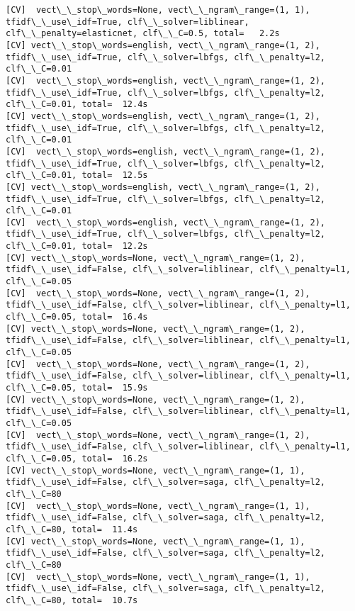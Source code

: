 \documentclass[11pt]{article}
\begin{document}
    \begin{Verbatim}[commandchars=\\\{\}]
[CV]  vect\_\_stop\_words=None, vect\_\_ngram\_range=(1, 1), tfidf\_\_use\_idf=True, clf\_\_solver=liblinear, clf\_\_penalty=elasticnet, clf\_\_C=0.5, total=   2.2s
[CV] vect\_\_stop\_words=english, vect\_\_ngram\_range=(1, 2), tfidf\_\_use\_idf=True, clf\_\_solver=lbfgs, clf\_\_penalty=l2, clf\_\_C=0.01 
[CV]  vect\_\_stop\_words=english, vect\_\_ngram\_range=(1, 2), tfidf\_\_use\_idf=True, clf\_\_solver=lbfgs, clf\_\_penalty=l2, clf\_\_C=0.01, total=  12.4s
[CV] vect\_\_stop\_words=english, vect\_\_ngram\_range=(1, 2), tfidf\_\_use\_idf=True, clf\_\_solver=lbfgs, clf\_\_penalty=l2, clf\_\_C=0.01 
[CV]  vect\_\_stop\_words=english, vect\_\_ngram\_range=(1, 2), tfidf\_\_use\_idf=True, clf\_\_solver=lbfgs, clf\_\_penalty=l2, clf\_\_C=0.01, total=  12.5s
[CV] vect\_\_stop\_words=english, vect\_\_ngram\_range=(1, 2), tfidf\_\_use\_idf=True, clf\_\_solver=lbfgs, clf\_\_penalty=l2, clf\_\_C=0.01 
[CV]  vect\_\_stop\_words=english, vect\_\_ngram\_range=(1, 2), tfidf\_\_use\_idf=True, clf\_\_solver=lbfgs, clf\_\_penalty=l2, clf\_\_C=0.01, total=  12.2s
[CV] vect\_\_stop\_words=None, vect\_\_ngram\_range=(1, 2), tfidf\_\_use\_idf=False, clf\_\_solver=liblinear, clf\_\_penalty=l1, clf\_\_C=0.05 
[CV]  vect\_\_stop\_words=None, vect\_\_ngram\_range=(1, 2), tfidf\_\_use\_idf=False, clf\_\_solver=liblinear, clf\_\_penalty=l1, clf\_\_C=0.05, total=  16.4s
[CV] vect\_\_stop\_words=None, vect\_\_ngram\_range=(1, 2), tfidf\_\_use\_idf=False, clf\_\_solver=liblinear, clf\_\_penalty=l1, clf\_\_C=0.05 
[CV]  vect\_\_stop\_words=None, vect\_\_ngram\_range=(1, 2), tfidf\_\_use\_idf=False, clf\_\_solver=liblinear, clf\_\_penalty=l1, clf\_\_C=0.05, total=  15.9s
[CV] vect\_\_stop\_words=None, vect\_\_ngram\_range=(1, 2), tfidf\_\_use\_idf=False, clf\_\_solver=liblinear, clf\_\_penalty=l1, clf\_\_C=0.05 
[CV]  vect\_\_stop\_words=None, vect\_\_ngram\_range=(1, 2), tfidf\_\_use\_idf=False, clf\_\_solver=liblinear, clf\_\_penalty=l1, clf\_\_C=0.05, total=  16.2s
[CV] vect\_\_stop\_words=None, vect\_\_ngram\_range=(1, 1), tfidf\_\_use\_idf=False, clf\_\_solver=saga, clf\_\_penalty=l2, clf\_\_C=80 
[CV]  vect\_\_stop\_words=None, vect\_\_ngram\_range=(1, 1), tfidf\_\_use\_idf=False, clf\_\_solver=saga, clf\_\_penalty=l2, clf\_\_C=80, total=  11.4s
[CV] vect\_\_stop\_words=None, vect\_\_ngram\_range=(1, 1), tfidf\_\_use\_idf=False, clf\_\_solver=saga, clf\_\_penalty=l2, clf\_\_C=80 
[CV]  vect\_\_stop\_words=None, vect\_\_ngram\_range=(1, 1), tfidf\_\_use\_idf=False, clf\_\_solver=saga, clf\_\_penalty=l2, clf\_\_C=80, total=  10.7s

\end{Verbatim}
\end{document}
